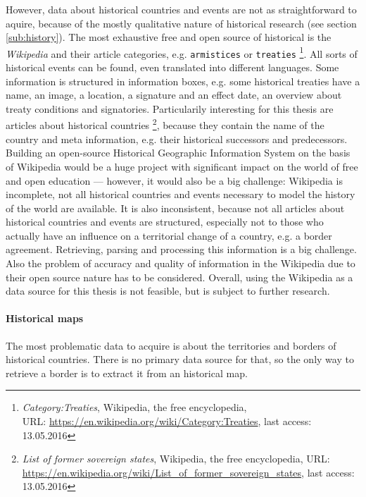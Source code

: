 However, data about historical countries and events are not as straightforward to aquire, because of the mostly qualitative nature of historical research (see section \ref{sub:history}). The most exhaustive free and open source of historical is the \emph{Wikipedia} and their article categories, e.g. \texttt{armistices} or \texttt{treaties}
\footnote{
  \textit{Category:Treaties},
  Wikipedia, the free encyclopedia,\\
  URL: \url{https://en.wikipedia.org/wiki/Category:Treaties},
  last access: 13.05.2016
}.
All sorts of historical events can be found, even translated into different languages. Some information is structured in information boxes, e.g. some historical treaties have a name, an image, a location, a signature and an effect date, an overview about treaty conditions and signatories. Particularily interesting for this thesis are articles about historical countries
\footnote{
  \textit{List of former sovereign states},
  Wikipedia, the free encyclopedia,
  URL: \url{https://en.wikipedia.org/wiki/List_of_former_sovereign_states},
  last access: 13.05.2016
},
because they contain the name of the country and meta information, e.g. their historical successors and predecessors. Building an open-source Historical Geographic Information System on the basis of Wikipedia would be a huge project with significant impact on the world of free and open education --- however, it would also be a big challenge: Wikipedia is incomplete, not all historical countries and events necessary to model the history of the world are available. It is also inconsistent, because not all articles about historical countries and events are structured, especially not to those who actually have an influence on a territorial change of a country, e.g. a border agreement. Retrieving, parsing and processing this information is a big challenge. Also the problem of accuracy and quality of information in the Wikipedia due to their open source nature has to be considered. Overall, using the Wikipedia as a data source for this thesis is not feasible, but is subject to further research.

\paragraph{Historical maps} %
\label{par:historical_map}

The most problematic data to acquire is about the territories and borders of historical countries. There is no primary data source for that, so the only way to retrieve a border is to extract it from an historical map.

